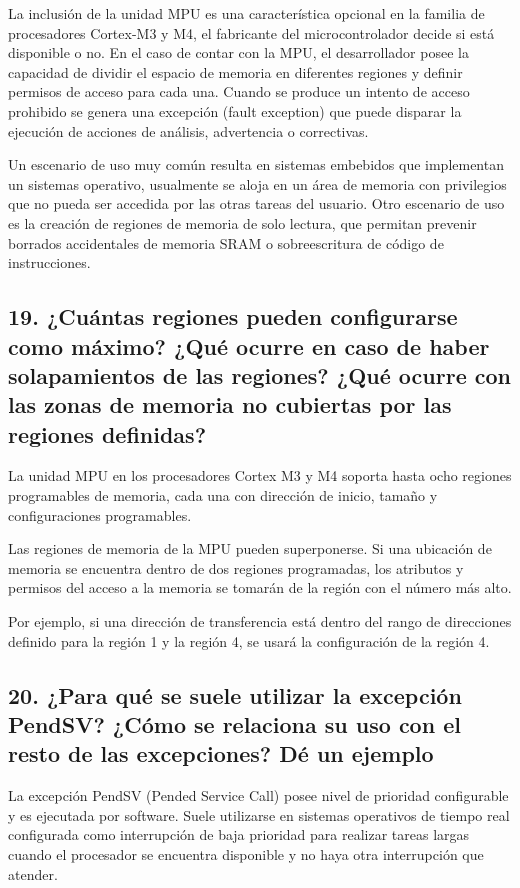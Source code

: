 \documentclass[10pt,a4paper,twoside,spanish]{article}	%
\begin{document}
La inclusión de la unidad MPU es una característica opcional en la familia de procesadores Cortex-M3 y M4, el fabricante del microcontrolador decide si está disponible o no. En el caso de contar con la MPU, el desarrollador posee la capacidad de dividir el espacio de memoria en diferentes regiones y definir permisos de acceso para cada una. Cuando se produce un intento de acceso prohibido se genera una excepción (fault exception) que puede disparar la ejecución de acciones de análisis, advertencia o correctivas. 

Un escenario de uso muy común resulta en sistemas embebidos que implementan un sistemas operativo, usualmente se aloja en un área de memoria con privilegios que no pueda ser accedida por las otras tareas del usuario. Otro escenario de uso es la creación de regiones de memoria de solo lectura, que permitan prevenir borrados accidentales de memoria SRAM o sobreescritura de código de instrucciones.

\subsection*{19. ¿Cuántas regiones pueden configurarse como máximo? ¿Qué ocurre en caso de haber solapamientos de las regiones? ¿Qué ocurre con las zonas de memoria no cubiertas por las regiones definidas?}

La unidad MPU en los procesadores Cortex M3 y M4 soporta hasta ocho regiones programables de memoria, cada una con dirección de inicio, tamaño y configuraciones programables.

Las regiones de memoria de la MPU pueden superponerse. Si una ubicación de memoria se encuentra dentro de dos regiones programadas, los atributos y permisos del acceso a la memoria se tomarán de la región con el número más alto.

Por ejemplo, si una dirección de transferencia está dentro del rango de direcciones definido para la región 1 y la región 4, se usará la configuración de la región 4.


\subsection*{20. ¿Para qué se suele utilizar la excepción PendSV? ¿Cómo se relaciona su uso con el resto de las excepciones? Dé un ejemplo}

La excepción  PendSV (Pended Service Call) posee nivel de prioridad configurable y es ejecutada por software. Suele utilizarse en sistemas operativos de tiempo real configurada como interrupción de baja prioridad para realizar tareas largas cuando el procesador se encuentra disponible y no haya otra interrupción que atender.
\end{document}
